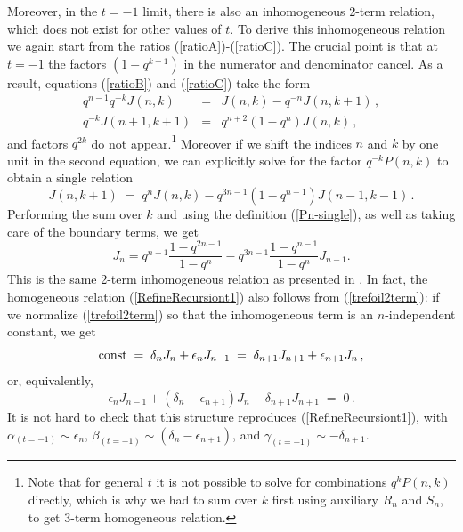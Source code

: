 \documentclass[hyper,letterpaper]{JHEP3}
\newcommand{\bea}{\begin{eqnarray}}
\newcommand{\eea}{\end{eqnarray}}
\newcommand{\be}{\begin{equation}}
\newcommand{\ee}{\end{equation}}
\begin{document}
Moreover, in the $t=-1$ limit, there is also an inhomogeneous 2-term relation,
which does not exist for other values of $t$.
To derive this inhomogeneous relation we again start from the ratios (\ref{ratioA})-(\ref{ratioC}).
The crucial point is that at $t=-1$ the factors $(1-q^{k+1})$ in the numerator and denominator cancel.
As a result, equations (\ref{ratioB}) and (\ref{ratioC}) take the form
\bea
q^{n-1} q^{-k} J(n,k) & = & J(n,k) - q^{-n} J(n,k+1) \,, \\
q^{-k} J(n+1,k+1) & = & q^{n+2} (1 - q^n) J(n,k) \,,
\eea
and factors $q^{2k}$ do not appear.\footnote{Note that for general $t$ it is not possible to solve for combinations $q^k P(n,k)$ directly, which is why we had to sum over $k$ first using auxiliary $R_n$ and $S_n$, to get 3-term homogeneous relation.}
Moreover if we shift the indices $n$ and $k$ by one unit in the second equation,
we can explicitly solve for the factor $q^{-k} P(n,k)$ to obtain a single relation
$$
J(n,k+1) \; = \; q^n J(n,k) - q^{3n-1} (1 - q^{n-1}) J(n-1,k-1) \,.
$$
Performing the sum over $k$ and using the definition (\ref{Pn-single}), as well as taking care of the boundary terms, we get
\be
J_n = q^{n-1} \frac{1-q^{2n-1}}{1-q^n} - q^{3n-1} \frac{1-q^{n-1}}{1-q^n} J_{n-1}.   \label{trefoil2term}
\ee
This is the same 2-term inhomogeneous relation as presented in \cite{Garoufalidis}.
In fact, the homogeneous relation (\ref{RefineRecursiont1}) also follows from (\ref{trefoil2term}):
if we normalize (\ref{trefoil2term}) so that the inhomogeneous term is an $n$-independent constant, we get
$$
{\rm const} \; = \; \delta_n J_n + \epsilon_n J_{n-1} \; = \; \delta_{n+1} J_{n+1} + \epsilon_{n+1} J_{n} \,,
$$
or, equivalently,
$$
\epsilon_n J_{n-1} + (\delta_n - \epsilon_{n+1} ) J_n - \delta_{n+1} J_{n+1} \; = \; 0 \,.
$$
It is not hard to check that this structure reproduces (\ref{RefineRecursiont1}), with
$\alpha_{(t=-1)} \sim \epsilon_n$,
$\beta_{(t=-1)} \sim (\delta_n - \epsilon_{n+1})$,
and $\gamma_{(t=-1)} \sim - \delta_{n+1}$.



\end{document}
